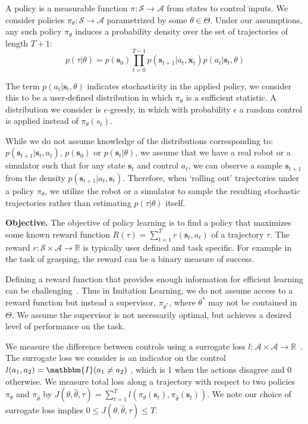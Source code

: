 \documentclass[conference]{article}
\newcommand{\bs}{\mathbf{s}}
\newcommand{\bx}{\mathbf{x}}
\begin{document}
A policy is a measurable function $\pi: \mathcal{S} \to \mathcal{A}$ from states to control inputs. 
We consider policies $\pi_{\theta}:\mathcal{S}\to \mathcal{A}$ parametrized by some $\theta\in \Theta$. Under our assumptions, any such policy $\pi_{\theta}$ induces a probability density over the set of  trajectories of length $T+1$: $$p(\tau | \theta)=
p(\bs_0)\prod_{t=0}^{T-1}p(\bs_{t+1}|a_t,\bx_t)p(a_t|\bs_t,\theta)$$

The term $p(a_t|\bs_t,\theta)$ indicates stochasticity in the applied policy, we consider this to be a user-defined distribution in which $\pi_{\theta}$ is a sufficient statistic. A distribution we consider is $\epsilon$-greedy, in which with probability $\epsilon$ a random control is applied instead of $\pi_{\theta}(s_t)$. 

While we do not assume knowledge of the distributions corresponding to: $p(\bs_{t+1}|\bs_t,a_t)$, $p(\bs_0)$ or $p(\bs_t|
\theta)$, we assume that we have a real robot or a simulator such that for any state
$\bs_t$ and control $a_t$, we can observe a sample $\bs_{t+1}$ from the density $p(\bs_{t+1}|a_t,\bs_t)$. 
Therefore, when `rolling out' trajectories under a policy
$\pi_{\theta}$, we utilize the robot or a simulator to sample the resulting stochastic trajectories rather than
estimating $p(\tau|\theta)$ itself.


\noindent\textbf{Objective.} The objective of policy learning is to find a policy that maximizes some known reward function $R(\tau) = \sum^T_{t=1} r(\bs_t,a_t)$ of a trajectory $\tau$. The reward $r:\mathcal{S}\times \mathcal{A}\to \mathbb{R}$ is typically user defined and task specific. 
For example in the task of grasping, the reward can be a binary measure of success.

Defining a reward function that provides enough information for efficient learning can be challenging~\cite{abbeel2004apprenticeship}. Thus in Imitation Learning, we do not assume access to a reward function but instead
a supervisor, $\pi_{\theta^*}$, where $\theta^*$ may not be contained in $\Theta$. We assume the supervisor is not necessarily optimal, but achieves a desired level of performance on the task. 

We measure the difference between controls using a surrogate loss $l : \mathcal{A} \times \mathcal{A} \rightarrow \mathbb{R}$~\cite{ross2010reduction,ross2010efficient}.
The surrogate loss we consider is an indicator on the control $l(a_1,a_2) = \mathbbm{I}(a_1 \neq a_2)$ , which is 1 when the actions disagree and 0 otherwise. 
We measure total loss along a trajectory with respect to two policies $\pi_{\theta}$ and $\pi_{\hat{\theta}}$ by $J(\theta, \hat{\theta},\tau) = \sum^T_{t=1} l(\pi_{\theta}(\bs_{t}),\pi_{\hat{\theta}}(\bs_{t}))$. We note our choice of surrogate loss  implies $0 \leq J(\theta, \hat{\theta},\tau) \leq T$.
\end{document}
